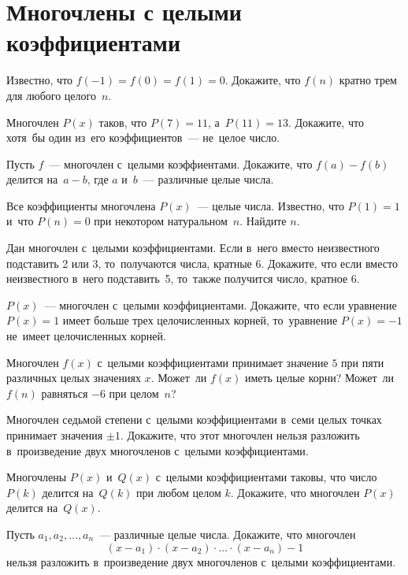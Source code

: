 
\section*{Многочлены с целыми коэффициентами}


\begin{problems}

\item
Известно, что $f(-1) = f(0) = f(1) = 0$.
Докажите, что $f(n)$ кратно трем для любого целого~$n$.

\item
Многочлен $P(x)$ таков, что $P(7) = 11$, а~$P(11) = 13$.
Докажите, что хотя~бы один из~его коэффициентов~--- не~целое число.

\item
Пусть $f$~--- многочлен с~целыми коэффиентами.
Докажите, что $f(a) - f(b)$ делится на~$a - b$, где $a$ и~$b$~--- различные
целые числа.

\item
Все коэффициенты многочлена $P(x)$~--- целые числа.
Известно, что $P(1) = 1$ и~что $P(n) = 0$ при некотором натуральном~$n$.
Найдите $n$.

\item
Дан многочлен с~целыми коэффициентами.
Если в~него вместо неизвестного подставить 2 или 3, то~получаются числа,
кратные 6.
Докажите, что если вместо неизвестного в~него подставить~5, то~также получится
число, кратное 6.

\item
$P(x)$~--- многочлен с~целыми коэффициентами.
Докажите, что если уравнение $P(x) = 1$ имеет больше трех целочисленных корней,
то~уравнение $P(x) = -1$ не~имеет целочисленных корней.

\item
Многочлен $f(x)$ с~целыми коэффициентами принимает значение $5$ при пяти
различных целых значениях $x$.
Может~ли $f(x)$ иметь целые корни?
Может~ли $f(n)$ равняться $-6$ при целом~$n$?

\item
Многочлен седьмой степени с~целыми коэффициентами в~семи целых точках принимает
значения $\pm 1$.
Докажите, что этот многочлен нельзя разложить в~произведение двух многочленов
с~целыми коэффициентами.

\item
Многочлены $P(x)$ и~$Q(x)$ с~целыми коэффициентами таковы, что число $P(k)$
делится на~$Q(k)$ при любом целом $k$.
Докажите, что многочлен $P(x)$ делится на~$Q(x)$.

\item
Пусть $a_1, a_2, \ldots, a_n$~--- различные целые числа.
Докажите, что многочлен
\[
    (x - a_1) \cdot (x - a_2) \cdot \ldots \cdot (x - a_n) - 1
\]
нельзя разложить в~произведение двух многочленов с~целыми коэффициентами.

\end{problems}

